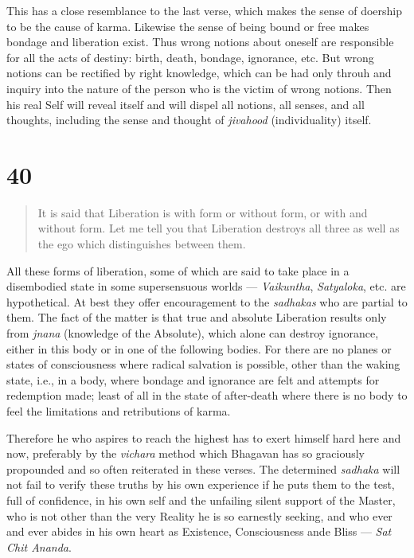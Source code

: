 \documentclass[12pt]{report}
\begin{document}
{

This has a close resemblance to the last verse, which makes the sense
of doership to be the cause of karma. Likewise the sense of being
bound or free makes bondage and liberation exist. Thus wrong notions
about oneself are responsible for all the acts of destiny: birth,
death, bondage, ignorance, etc. But wrong notions can be rectified by
right knowledge, which can be had only throuh and inquiry into the
nature of the person who is the victim of wrong notions. Then his real
Self will reveal itself and will dispel all notions, all senses, and
all thoughts, including the sense and thought of \emph{jivahood}
(individuality) itself.

\section*{40}

\begin{quote}
  It is said that Liberation is with form or without form, or with and
  without form. Let me tell you that Liberation destroys all three as
  well as the ego which distinguishes between them.
\end{quote}


All these forms of liberation, some of which are said to take place in
a disembodied state in some supersensuous worlds --- \emph{Vaikuntha},
\emph{Satyaloka}, etc. are hypothetical. At best they offer
encouragement to the \emph{sadhakas} who are partial to them. The fact
of the matter is that true and absolute Liberation results only from
\emph{jnana} (knowledge of the Absolute), which alone can destroy
ignorance, either in this body or in one of the following bodies. For
there are no planes or states of consciousness where radical salvation
is possible, other than the waking state, i.e., in a body, where
bondage and ignorance are felt and attempts for redemption made; least
of all in the state of after-death where there is no body to feel the
limitations and retributions of karma.

Therefore he who aspires to reach the highest has to exert himself
hard here and now, preferably by the \emph{vichara} method which
Bhagavan has so graciously propounded and so often reiterated in these
verses. The determined \emph{sadhaka} will not fail to verify these
truths by his own experience if he puts them to the test, full of
confidence, in his own self and the unfailing silent support of the
Master, who is not other than the very Reality he is so earnestly
seeking, and who ever and ever abides in his own heart as Existence,
Consciousness ande Bliss --- \emph{Sat Chit Ananda}.

}
\end{document}
